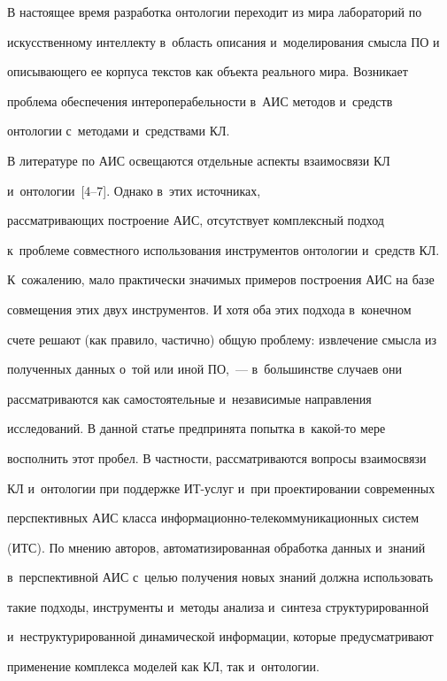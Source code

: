   В настоящее время разработка онтологии переходит из мира лабораторий по 


искусственному интеллекту в~область описания и~моделирования смысла ПО и~


описывающего ее корпуса текстов как объекта реального мира. Возникает 


проблема обеспечения интероперабельности в~АИС методов и~средств 


онтологии с~методами и~средствами КЛ. 


  


  В литературе по АИС освещаются отдельные аспекты взаимосвязи КЛ 


и~онтологии~[4--7]. Однако в~этих источниках, 


рассматривающих построение АИС, отсутствует комплексный подход 


к~проблеме совместного использования инструментов онтологии и~средств КЛ. 


К~сожалению, мало практически значимых примеров построения АИС на базе 


совмещения этих двух инструментов. И хотя оба этих подхода в~конечном 


счете решают (как правило, частично) общую проблему: извлечение смысла из 


полученных данных о~той или иной ПО,~--- в~большинстве случаев они 


рассматриваются как самостоятельные и~независимые направления 


исследований. В данной статье предпринята попытка в~какой-то мере 


восполнить этот пробел. В частности, рассматриваются вопросы взаимосвязи 


КЛ и~онтологии при поддержке ИТ-услуг и~при проектировании современных 


перспективных АИС класса ин\-фор\-ма\-ци\-он\-но-те\-ле\-ком\-му\-ни\-ка\-ци\-он\-ных сис\-тем 


(ИТС). По мнению авторов, автоматизированная обработка данных и~знаний 


в~перспективной АИС с~целью получения новых знаний должна использовать 


такие подходы, инструменты и~методы анализа и~синтеза структурированной 


и~неструктурированной динамической информации, которые предусматривают 


применение комплекса моделей как КЛ, так и~онтологии.


